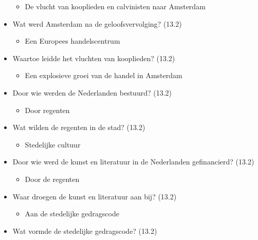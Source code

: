 \begin{itemize}
  \begin{itemize}
  \itemsep1pt\parskip0pt
  \item
    De vlucht van kooplieden en calvinisten naar Amsterdam
  \end{itemize}
\item
  Wat werd Amsterdam na de geloofsvervolging? (13.2)

  \begin{itemize}
  \itemsep1pt\parskip0pt
  \item
    Een Europees handelscentrum
  \end{itemize}
\item
  Waartoe leidde het vluchten van kooplieden? (13.2)

  \begin{itemize}
  \itemsep1pt\parskip0pt
  \item
    Een explosieve groei van de handel in Amsterdam
  \end{itemize}
\item
  Door wie werden de Nederlanden bestuurd? (13.2)

  \begin{itemize}
  \itemsep1pt\parskip0pt
  \item
    Door regenten
  \end{itemize}
\item
  Wat wilden de regenten in de stad? (13.2)

  \begin{itemize}
  \itemsep1pt\parskip0pt
  \item
    Stedelijke cultuur
  \end{itemize}
\item
  Door wie werd de kunst en literatuur in de Nederlanden gefinancierd?
  (13.2)

  \begin{itemize}
  \itemsep1pt\parskip0pt
  \item
    Door de regenten
  \end{itemize}
\item
  Waar droegen de kunst en literatuur aan bij? (13.2)

  \begin{itemize}
  \itemsep1pt\parskip0pt
  \item
    Aan de stedelijke gedragscode
  \end{itemize}
\item
  Wat vormde de stedelijke gedragscode? (13.2)


\end{itemize}
